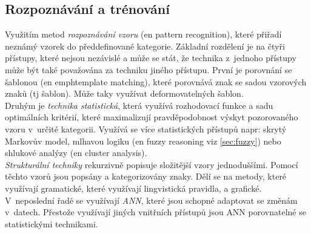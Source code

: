 \documentclass[12pt]{report}			%
\begin{document}
	\subsection{Rozpoznávání a trénování}	
	Využitím metod \emph{rozpoznávání vzoru} (\gls{en} pattern recognition), které přiřadí neznámý vzorek do předdefinované kategorie. Základní rozdělení je na čtyři přístupy, které nejsou nezávislé a může se stát, že technika z~jednoho přístupy může být také považována za techniku jiného přístupu. První je porovnání se šablonou (\gls{en} emph{template matching}), které porovnává znak se sadou vzorových znaků (\gls{tj} šablon). Může taky využívat deformovatelných šablon. \parencite[\gls{s} 29-34]{chaudhuri2017optical}\\
	Druhým je \emph{technika statistická}, která využívá rozhodovací funkce a sadu optimálních kritérií, které maximalizují pravděpodobnost výskyt pozorovaného vzoru v~určité kategorii. Využívá se více statistických přístupů \gls{napr}: skrytý Markovův model, mlhavou logiku (\gls{en} fuzzy reasoning \gls{viz} \ref{sec:fuzzy}) nebo shlukové analýzy (\gls{en} cluster analysis). \parencite[\gls{s} 29-34]{chaudhuri2017optical}\\
	\emph{Strukturální techniky} rekurzivně popisuje složitější vzory jednoduššími. Pomocí těchto vzorů jsou popsány a kategorizovány znaky. Dělí se na metody, které využívají gramatické, které využívají lingvistická pravidla, a grafické.
	V~neposlední řadě se využívají \emph{\gls{ANN}}, které jsou schopné adaptovat se změnám v~datech. Přestože využívají jiných vnitřních přístupů jsou \gls{ANN} porovnatelné se statistickými technikami. \parencite[\gls{s} 29-34]{chaudhuri2017optical}
\end{document}
